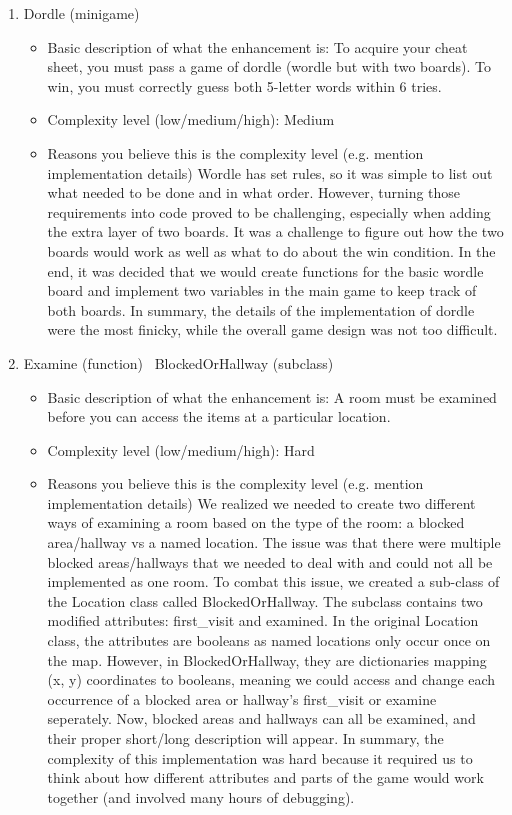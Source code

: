\documentclass[11pt]{article}
\begin{document}
\begin{enumerate}
\item Dordle (minigame)
	\begin{itemize}
	\item Basic description of what the enhancement is: To acquire your cheat sheet, you must pass a game of dordle
	(wordle but with two boards). To win, you must correctly guess both 5-letter words within 6 tries.
	\item Complexity level (low/medium/high): Medium
	\item Reasons you believe this is the complexity level (e.g. mention implementation details)
	Wordle has set rules, so it was simple to list out what needed to be done and in what order. However, turning those
	requirements into code proved to be challenging, especially when adding the extra layer of two boards. It was a
	challenge to figure out how the two boards would work as well as what to do about the win condition. In the end, it
	was decided that we would create functions for the basic wordle board and implement two variables in the main game
	to keep track of both boards. In summary, the details of the implementation of dordle were the most finicky, while
	the overall game design was not too difficult.
	\end{itemize}


\item Examine (function) \ BlockedOrHallway (subclass)
	\begin{itemize}
	\item Basic description of what the enhancement is: A room must be examined before you can access the items at a
	particular location.
	\item Complexity level (low/medium/high): Hard
	\item Reasons you believe this is the complexity level (e.g. mention implementation details)
	We realized we needed to create two different ways of examining a room based on the type of the room:
	a blocked area/hallway vs a named location. The issue was that there were multiple blocked areas/hallways that we
	needed to deal with and could not all be implemented as one room. To combat this issue, we created a sub-class of
	the Location class called BlockedOrHallway. The subclass contains two modified attributes: first_visit and examined.
	In the original Location class, the attributes are booleans as named locations only occur once on the map. However,
	in BlockedOrHallway, they are dictionaries mapping (x, y) coordinates to booleans, meaning we could access and
	change each occurrence of a blocked area or hallway's first_visit or examine seperately. Now, blocked areas and
	hallways can all be examined, and their proper short/long description will appear. In summary, the complexity of
	this implementation was hard because it required us to think about how different attributes and parts of the game
	would work together (and involved many hours of debugging).
	\end{itemize}




\end{enumerate}
\end{document}
